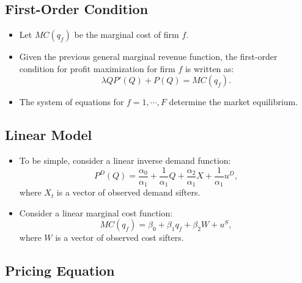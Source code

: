 \documentclass[
]{book}
\providecommand{\tightlist}{%
  \setlength{\itemsep}{0pt}\setlength{\parskip}{0pt}}
\begin{document}
\hypertarget{first-order-condition}{%
\subsection{First-Order Condition}\label{first-order-condition}}

\begin{itemize}
\tightlist
\item
  Let \(MC(q_f)\) be the marginal cost of firm \(f\).
\item
  Given the previous general marginal revenue function, the first-order condition for profit maximization for firm \(f\) is written as:
  \begin{equation}
  \lambda Q P'(Q) + P(Q) = MC(q_f).
  \end{equation}
\item
  The system of equations for \(f = 1, \cdots, F\) determine the market equilibrium.
\end{itemize}

\hypertarget{linear-model}{%
\subsection{Linear Model}\label{linear-model}}

\begin{itemize}
\tightlist
\item
  To be simple, consider a linear inverse demand function:
  \begin{equation}
  P^D(Q) = \frac{\alpha_0}{\alpha_1} + \frac{1}{\alpha_1}Q + \frac{\alpha_2}{\alpha_1} X + \frac{1}{\alpha_1}u^D,
  \end{equation}
  where \(X_t\) is a vector of observed demand sifters.
\item
  Consider a linear marginal cost function:
  \begin{equation}
  MC(q_{f}) = \beta_0 + \beta_1 q_{f} + \beta_2 W + u^S,
  \end{equation}
  where \(W\) is a vector of observed cost sifters.
\end{itemize}

\hypertarget{pricing-equation}{%
\subsection{Pricing Equation}\label{pricing-equation}}
\end{document}
